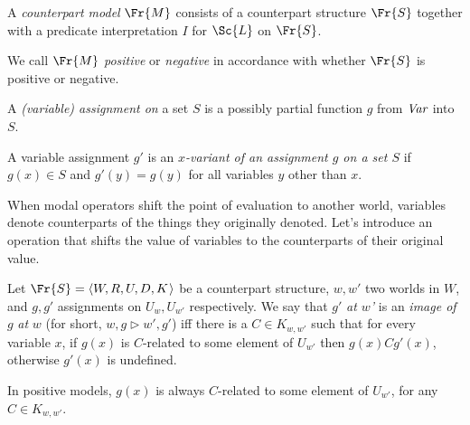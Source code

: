 \documentclass[11pt]{woarticle}
\theoremstyle{break}
\theoremstyle{nonumberplain}
\newcommand{\Img}{\triangleright}
\newcommand{\1}{\;\,|\;\,}
\renewcommand{\t}[1]{\ensuremath{\langle #1  \makebox[.2ex]{}\rangle}}
\begin{document}
\begin{definition}\label{!MOD}
  A \emph{counterpart model} $\Fr{M}$ consists of a counterpart structure
  $\Fr{S}$ together with a predicate interpretation $I$ for $\Sc{L}$ on
  $\Fr{S}$.

  We call $\Fr{M}$ \emph{positive} or \emph{negative} in accordance with whether
  $\Fr{S}$ is positive or negative.  
\end{definition}


\begin{definition}[Assignment]\label{!ASSIGNMENT}
  A \emph{(variable) assignment on} a set $S$ is a possibly partial function $g$
  from $\emph{Var}$ into $S$.
\end{definition}

\begin{definition}[Variant]\label{!VARIANT}
  A variable assignment $g'$ is an \emph{$x$-variant of an assignment $g$ on a
    set $S$} if $g(x) \in S$ and $g'(y) = g(y)$ for all variables $y$ other than
  $x$.
\end{definition}

When modal operators shift the point of evaluation to another world, variables
denote counterparts of the things they originally denoted. Let's introduce an
operation that shifts the value of variables to the counterparts of their
original value.

\begin{definition}[Image]\label{!IMG}
  Let $\Fr{S} = \t{W,R,U,D,K}$ be a counterpart structure, $w,w'$ two worlds in
  $W$, and $g,g'$ assignments on $U_{w},U_{w'}$ respectively. We say that $g'$
  \emph{at $w$'} is an \emph{image of} $g$ \emph{at} $w$ (for short,
  $w,g \Img w',g'$) iff there is a $C \in K_{w,w'}$ such that for every variable
  $x$, if $g(x)$ is $C$-related to some element of $U_{w'}$ then $g(x) C g'(x)$,
  otherwise $g'(x)$ is undefined.
\end{definition}

In positive models, $g(x)$ is always $C$-related to some element of $U_{w'}$,
for any $C \in K_{w,w'}$.
\end{document}
